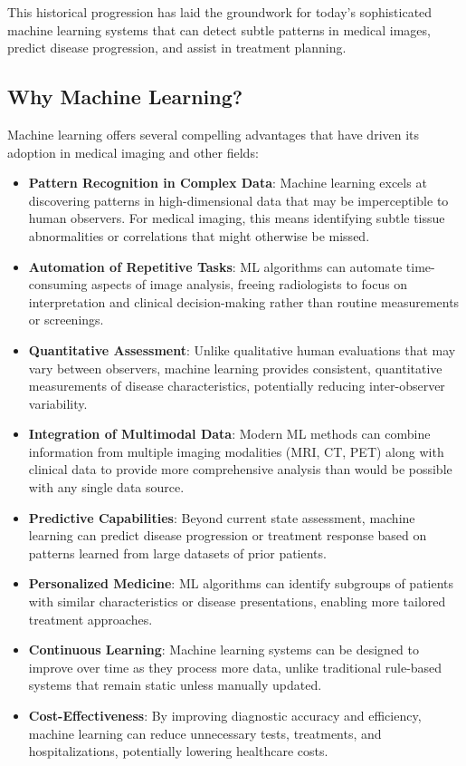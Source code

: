 This historical progression has laid the groundwork for today's sophisticated machine learning systems that can detect subtle patterns in medical images, predict disease progression, and assist in treatment planning.

\subsection{Why Machine Learning?}
\label{sec:why_ml}
Machine learning offers several compelling advantages that have driven its adoption in medical imaging and other fields:

\begin{itemize}
  \item \textbf{Pattern Recognition in Complex Data}: Machine learning excels at discovering patterns in high-dimensional data that may be imperceptible to human observers. For medical imaging, this means identifying subtle tissue abnormalities or correlations that might otherwise be missed.

  \item \textbf{Automation of Repetitive Tasks}: ML algorithms can automate time-consuming aspects of image analysis, freeing radiologists to focus on interpretation and clinical decision-making rather than routine measurements or screenings.

  \item \textbf{Quantitative Assessment}: Unlike qualitative human evaluations that may vary between observers, machine learning provides consistent, quantitative measurements of disease characteristics, potentially reducing inter-observer variability.

  \item \textbf{Integration of Multimodal Data}: Modern ML methods can combine information from multiple imaging modalities (MRI, CT, PET) along with clinical data to provide more comprehensive analysis than would be possible with any single data source.

  \item \textbf{Predictive Capabilities}: Beyond current state assessment, machine learning can predict disease progression or treatment response based on patterns learned from large datasets of prior patients.

  \item \textbf{Personalized Medicine}: ML algorithms can identify subgroups of patients with similar characteristics or disease presentations, enabling more tailored treatment approaches.

  \item \textbf{Continuous Learning}: Machine learning systems can be designed to improve over time as they process more data, unlike traditional rule-based systems that remain static unless manually updated.

  \item \textbf{Cost-Effectiveness}: By improving diagnostic accuracy and efficiency, machine learning can reduce unnecessary tests, treatments, and hospitalizations, potentially lowering healthcare costs.
\end{itemize}

